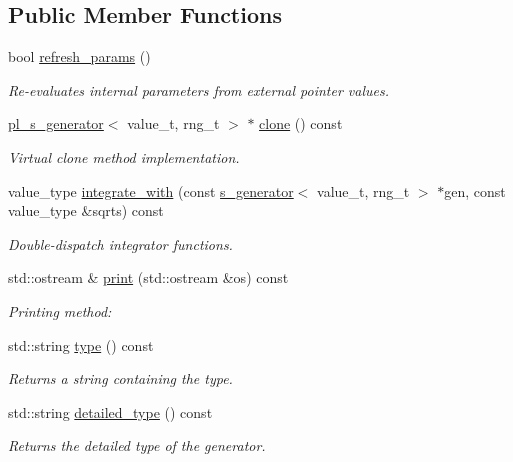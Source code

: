 \subsection*{Public Member Functions}
\begin{DoxyCompactItemize}
\item 
bool \hyperlink{a00420_abb6073746537d15066fd655b9f96b56f}{refresh\-\_\-params} ()
\begin{DoxyCompactList}\small\item\em Re-\/evaluates internal parameters from external pointer values. \end{DoxyCompactList}\item 
\hypertarget{a00420_a41cc5d98d5f572ef7038d5d8ac126d88}{\hyperlink{a00420}{pl\-\_\-s\-\_\-generator}$<$ value\-\_\-t, rng\-\_\-t $>$ $\ast$ \hyperlink{a00420_a41cc5d98d5f572ef7038d5d8ac126d88}{clone} () const }\label{a00420_a41cc5d98d5f572ef7038d5d8ac126d88}

\begin{DoxyCompactList}\small\item\em Virtual clone method implementation. \end{DoxyCompactList}\item 
\hypertarget{a00420_afed7c627da7fc1f181b5f08e74b138cd}{value\-\_\-type \hyperlink{a00420_afed7c627da7fc1f181b5f08e74b138cd}{integrate\-\_\-with} (const \hyperlink{a00482}{s\-\_\-generator}$<$ value\-\_\-t, rng\-\_\-t $>$ $\ast$gen, const value\-\_\-type \&sqrts) const }\label{a00420_afed7c627da7fc1f181b5f08e74b138cd}

\begin{DoxyCompactList}\small\item\em Double-\/dispatch integrator functions. \end{DoxyCompactList}\item 
\hypertarget{a00420_a165e3ff502e0739d7d0150bfdce2e1db}{std\-::ostream \& \hyperlink{a00420_a165e3ff502e0739d7d0150bfdce2e1db}{print} (std\-::ostream \&os) const }\label{a00420_a165e3ff502e0739d7d0150bfdce2e1db}

\begin{DoxyCompactList}\small\item\em Printing method\-: \end{DoxyCompactList}\item 
\hypertarget{a00420_a38381da134ae15167fd523d2739d463a}{std\-::string \hyperlink{a00420_a38381da134ae15167fd523d2739d463a}{type} () const }\label{a00420_a38381da134ae15167fd523d2739d463a}

\begin{DoxyCompactList}\small\item\em Returns a string containing the type. \end{DoxyCompactList}\item 
\hypertarget{a00420_a3d4c2fc9982d00c6ed38ed04e8b3518a}{std\-::string \hyperlink{a00420_a3d4c2fc9982d00c6ed38ed04e8b3518a}{detailed\-\_\-type} () const }\label{a00420_a3d4c2fc9982d00c6ed38ed04e8b3518a}

\begin{DoxyCompactList}\small\item\em Returns the detailed type of the generator. \end{DoxyCompactList}\end{DoxyCompactItemize}
